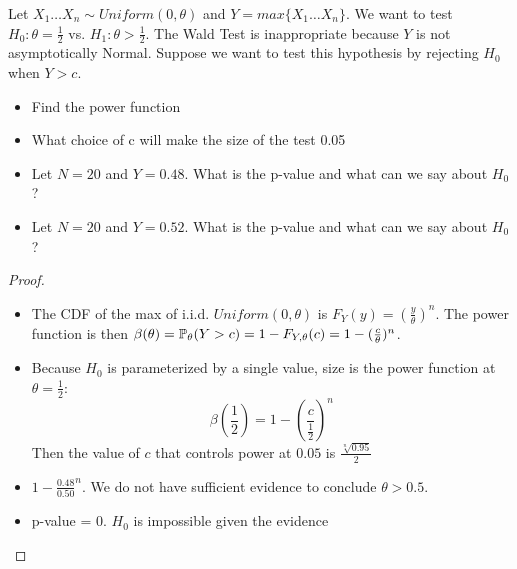 \documentclass[10pt]{article}
\begin{document}
\setcounter{exercise}{4}
\begin{exercise}
    Let $X_1 \dots X_n \sim Uniform(0, \theta)$ and $Y = max\{X_1 \dots
    X_n\}$. We want to test $H_0: \theta = \frac{1}{2}$ vs. $H_1: \theta >
    \frac{1}{2}$. The Wald Test is inappropriate because $Y$ is not
    asymptotically Normal. Suppose we want to test this hypothesis by rejecting
    $H_0$ when $Y > c$.
    \begin{itemize}
        \item{Find the power function}
        \item{What choice of c will make the size of the test 0.05}
        \item{Let $N=20$ and $Y=0.48$. What is the p-value and what can we say about $H_0$?}
        \item{Let $N=20$ and $Y=0.52$. What is the p-value and what can we say about $H_0$?}
    \end{itemize}
\end{exercise}

\begin{proof}
    \begin{itemize}
        \item{The CDF of the max of i.i.d. $Uniform(0, \theta)$ is $F_Y(y) =
                (\frac{y}{\theta})^n$. The power function is then
                $\beta(\theta) = \P_\theta(Y > c) = 1 - F_{Y, \theta}(c) = 1 -
            (\frac{c}{\theta})^n$.}
        \item{Because $H_0$ is parameterized by a single value, size is the
            power function at $\theta=\frac{1}{2}$:
            \[\beta(\frac{1}{2}) = 1 - (\frac{c}{\frac{1}{2}})^n\]
            Then the value of $c$ that controls power at $0.05$ is
        $\frac{\sqrt[n]{0.95}}{2}$}
        \item{$1 - \frac{0.48}{0.50}^n$. We do not have sufficient evidence to
            conclude $\theta > 0.5$. }
        \item{p-value = 0. $H_0$ is impossible given the evidence}
    \end{itemize}
\end{proof}
\end{document}
